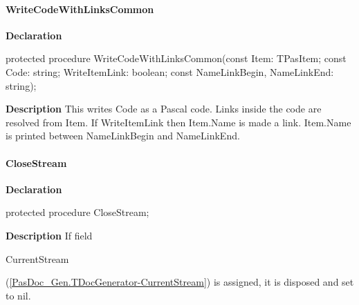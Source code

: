 \documentclass{report}
\newif\ifpdf
\begin{document}
\paragraph*{WriteCodeWithLinksCommon}\hspace*{\fill}

\label{PasDoc_Gen.TDocGenerator-WriteCodeWithLinksCommon}
\begin{list}{}{
\setlength{\itemindent}{0cm}
\setlength{\listparindent}{0cm}
\setlength{\leftmargin}{\evensidemargin}
\addtolength{\leftmargin}{\tmplength}
\settowidth{\labelsep}{X}
\addtolength{\leftmargin}{\labelsep}
\setlength{\labelwidth}{\tmplength}
}
\item[\textbf{Declaration}\hfill]
\ifpdf
\begin{flushleft}
\fi
\begin{ttfamily}
protected procedure WriteCodeWithLinksCommon(const Item: TPasItem; const Code: string; WriteItemLink: boolean; const NameLinkBegin, NameLinkEnd: string);\end{ttfamily}

\ifpdf
\end{flushleft}
\fi

\par
\item[\textbf{Description}]
This writes Code as a Pascal code. Links inside the code are resolved from Item. If WriteItemLink then Item.Name is made a link. Item.Name is printed between NameLinkBegin and NameLinkEnd.

\end{list}
\paragraph*{CloseStream}\hspace*{\fill}

\label{PasDoc_Gen.TDocGenerator-CloseStream}
\begin{list}{}{
\setlength{\itemindent}{0cm}
\setlength{\listparindent}{0cm}
\setlength{\leftmargin}{\evensidemargin}
\addtolength{\leftmargin}{\tmplength}
\settowidth{\labelsep}{X}
\addtolength{\leftmargin}{\labelsep}
\setlength{\labelwidth}{\tmplength}
}
\item[\textbf{Declaration}\hfill]
\ifpdf
\begin{flushleft}
\fi
\begin{ttfamily}
protected procedure CloseStream;\end{ttfamily}

\ifpdf
\end{flushleft}
\fi

\par
\item[\textbf{Description}]
If field \begin{ttfamily}CurrentStream\end{ttfamily}(\ref{PasDoc_Gen.TDocGenerator-CurrentStream}) is assigned, it is disposed and set to nil.

\end{list}
\end{document}

